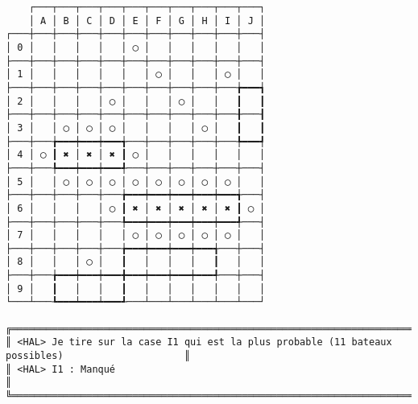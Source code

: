 {\scriptsize
\begin{verbatim}
    ┌───┬───┬───┬───┬───┬───┬───┬───┬───┬───┐
    │ A │ B │ C │ D │ E │ F │ G │ H │ I │ J │
┌───┼───┼───┼───┼───┼───┼───┼───┼───┼───┼───┤
│ 0 │   │   │   │   │ ◯ │   │   │   │   │   │
├───┼───┼───┼───┼───┼───┼───┼───┼───┼───┼───┤
│ 1 │   │   │   │   │   │ ◯ │   │   │ ◯ │   │
├───┼───┼───┼───┼───┼───┼───┼───┼───┼───╆━━━┪
│ 2 │   │   │   │ ◯ │   │   │ ◯ │   │   ┃   ┃
├───┼───┼───┼───┼───┼───┼───┼───┼───┼───╂───┨
│ 3 │   │ ◯ │ ◯ │ ◯ │   │   │   │ ◯ │   ┃   ┃
├───┼───╆━━━┿━━━┿━━━╅───┼───┼───┼───┼───╄━━━┩
│ 4 │ ◯ ┃ ✖ │ ✖ │ ✖ ┃ ◯ │   │   │   │   │   │
├───┼───╄━━━┿━━━┿━━━╃───┼───┼───┼───┼───┼───┤
│ 5 │   │ ◯ │ ◯ │ ◯ │ ◯ │ ◯ │ ◯ │ ◯ │ ◯ │   │
├───┼───┼───┼───┼───╆━━━┿━━━┿━━━┿━━━┿━━━╅───┤
│ 6 │   │   │   │ ◯ ┃ ✖ │ ✖ │ ✖ │ ✖ │ ✖ ┃ ◯ │
├───┼───┼───┼───┼───╄━━━┿━━━┿━━━┿━━━┿━━━╃───┤
│ 7 │   │   │   │   │ ◯ │ ◯ │ ◯ │ ◯ │ ◯ │   │
├───┼───┼───┼───┼───╆━━━┿━━━┿━━━┿━━━╅───┼───┤
│ 8 │   │   │ ◯ │   ┃   │   │   │   ┃   │   │
├───┼───╆━━━┿━━━┿━━━╋━━━┿━━━┿━━━┿━━━╃───┼───┤
│ 9 │   ┃   │   │   ┃   │   │   │   │   │   │
└───┴───┺━━━┷━━━┷━━━┹───┴───┴───┴───┴───┴───┘

╔══════════════════════════════════════════════════════════════════════════════════════════════════╗
║ <HAL> Je tire sur la case I1 qui est la plus probable (11 bateaux possibles)                     ║
║ <HAL> I1 : Manqué                                                                                ║
╚══════════════════════════════════════════════════════════════════════════════════════════════════╝
\end{verbatim}}
\newpage

